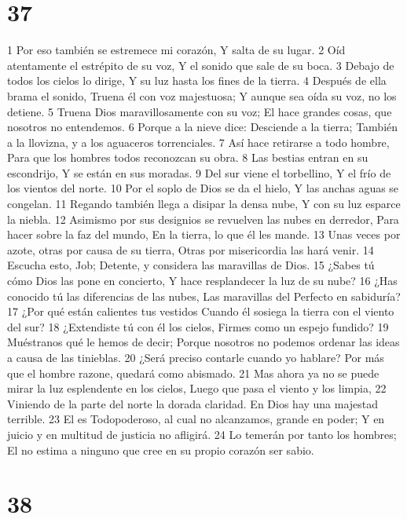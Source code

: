 \chapter{37}

1 Por eso también se estremece mi corazón,
Y salta de su lugar.
2 Oíd atentamente el estrépito de su voz,
Y el sonido que sale de su boca.
3 Debajo de todos los cielos lo dirige,
Y su luz hasta los fines de la tierra.
4 Después de ella brama el sonido,
Truena él con voz majestuosa;
Y aunque sea oída su voz, no los detiene.
5 Truena Dios maravillosamente con su voz;
El hace grandes cosas, que nosotros no entendemos.
6 Porque a la nieve dice: Desciende a la tierra;
También a la llovizna, y a los aguaceros torrenciales.
7 Así hace retirarse a todo hombre,
Para que los hombres todos reconozcan su obra.
8 Las bestias entran en su escondrijo,
Y se están en sus moradas.
9 Del sur viene el torbellino,
Y el frío de los vientos del norte.
10 Por el soplo de Dios se da el hielo,
Y las anchas aguas se congelan.
11 Regando también llega a disipar la densa nube,
Y con su luz esparce la niebla.
12 Asimismo por sus designios se revuelven las nubes en derredor,
Para hacer sobre la faz del mundo,
En la tierra, lo que él les mande.
13 Unas veces por azote, otras por causa de su tierra,
Otras por misericordia las hará venir.
14 Escucha esto, Job;
Detente, y considera las maravillas de Dios.
15 ¿Sabes tú cómo Dios las pone en concierto,
Y hace resplandecer la luz de su nube?
16 ¿Has conocido tú las diferencias de las nubes,
Las maravillas del Perfecto en sabiduría?
17 ¿Por qué están calientes tus vestidos
Cuando él sosiega la tierra con el viento del sur?
18 ¿Extendiste tú con él los cielos,
Firmes como un espejo fundido? 
19 Muéstranos qué le hemos de decir; 
Porque nosotros no podemos ordenar las ideas a causa de las tinieblas.
20 ¿Será preciso contarle cuando yo hablare?
Por más que el hombre razone, quedará como abismado.
21 Mas ahora ya no se puede mirar la luz esplendente en los cielos,
Luego que pasa el viento y los limpia,
22 Viniendo de la parte del norte la dorada claridad.
En Dios hay una majestad terrible.
23 El es Todopoderoso, al cual no alcanzamos, grande en poder;
Y en juicio y en multitud de justicia no afligirá.
24 Lo temerán por tanto los hombres;
El no estima a ninguno que cree en su propio corazón ser sabio.

\chapter{38}

